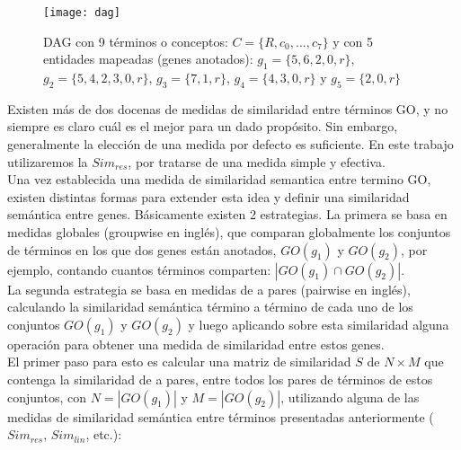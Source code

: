 \begin{figure}[h]
    \centering
    \texttt{[image: dag]}
    \caption{DAG con 9 términos o conceptos: $C=\{R, c_0,...,c_7\}$ y con 5 entidades mapeadas (genes anotados): $g_1=\{5, 6, 2, 0, r\}$, $g_2=\{5, 4, 2, 3, 0, r\}$, $g_3=\{7, 1, r\}$, $g_4=\{4, 3, 0, r\}$ y $g_5=\{2, 0, r\}$}
    \label{fig:dag}
\end{figure}
Existen más de dos docenas de medidas de similaridad entre términos GO, y no siempre es claro cuál es el mejor para un dado propósito. Sin embargo, generalmente la elección de una medida por defecto es suficiente\cite{Bose2016}. En este trabajo utilizaremos la $Sim_{res}$, por tratarse de una medida simple y efectiva.\\
Una vez establecida una medida de similaridad semantica entre termino GO, existen distintas formas para extender esta idea y definir una similaridad semántica entre genes. Básicamente existen 2
estrategias. La primera se basa en medidas globales (groupwise en inglés), que comparan globalmente los conjuntos de términos en los que dos genes están anotados, $GO(g_1)$ y $GO(g_2)$, por ejemplo, contando cuantos términos comparten: $|GO(g_1) \cap GO(g_2)|$.\cite{Lee2004} \\
La segunda estrategia se basa en medidas de a pares (pairwise en inglés), calculando la similaridad semántica término a término de cada uno de los conjuntos $GO(g_1)$ y $GO(g_2)$ y luego aplicando sobre esta similaridad alguna operación para obtener una medida de similaridad entre estos genes.\\
El primer paso para esto es calcular una matriz de similaridad $S$ de $N\times M$ que contenga la similaridad de a pares, entre todos los pares de términos de estos conjuntos, con $N=|GO(g_1)|$ y $M=|GO(g_2)|$, utilizando alguna de las medidas de similaridad semántica entre términos presentadas anteriormente ($Sim_{res}$, $Sim_{lin}$, etc.):

